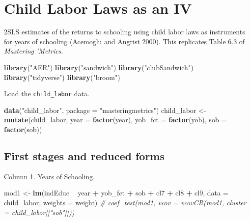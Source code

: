 \documentclass[]{book}
\newenvironment{Shaded}{\begin{snugshade}}{\end{snugshade}}
\newcommand{\CommentTok}[1]{\textcolor[rgb]{0.56,0.35,0.01}{\textit{#1}}}
\newcommand{\DataTypeTok}[1]{\textcolor[rgb]{0.13,0.29,0.53}{#1}}
\newcommand{\KeywordTok}[1]{\textcolor[rgb]{0.13,0.29,0.53}{\textbf{#1}}}
\newcommand{\NormalTok}[1]{#1}
\newcommand{\OperatorTok}[1]{\textcolor[rgb]{0.81,0.36,0.00}{\textbf{#1}}}
\newcommand{\StringTok}[1]{\textcolor[rgb]{0.31,0.60,0.02}{#1}}
\theoremstyle{definition}
\theoremstyle{definition}
\theoremstyle{definition}
\theoremstyle{remark}
\begin{document}
\hypertarget{child-labor-laws-as-an-iv}{%
\chapter{Child Labor Laws as an IV}\label{child-labor-laws-as-an-iv}}

2SLS estimates of the returns to schooling using child labor laws as
instruments for years of schooling (Acemoglu and Angrist 2000). This
replicates Table 6.3 of \emph{Mastering 'Metrics}.

\begin{Shaded}
\begin{Highlighting}[]
\KeywordTok{library}\NormalTok{(}\StringTok{"AER"}\NormalTok{)}
\KeywordTok{library}\NormalTok{(}\StringTok{"sandwich"}\NormalTok{)}
\KeywordTok{library}\NormalTok{(}\StringTok{"clubSandwich"}\NormalTok{)}
\KeywordTok{library}\NormalTok{(}\StringTok{"tidyverse"}\NormalTok{)}
\KeywordTok{library}\NormalTok{(}\StringTok{"broom"}\NormalTok{)}
\end{Highlighting}
\end{Shaded}

Load the \texttt{child\_labor} data.

\begin{Shaded}
\begin{Highlighting}[]
\KeywordTok{data}\NormalTok{(}\StringTok{"child_labor"}\NormalTok{, }\DataTypeTok{package =} \StringTok{"masteringmetrics"}\NormalTok{)}
\NormalTok{child_labor <-}\StringTok{ }\KeywordTok{mutate}\NormalTok{(child_labor,}
                      \DataTypeTok{year =} \KeywordTok{factor}\NormalTok{(year),}
                      \DataTypeTok{yob_fct =} \KeywordTok{factor}\NormalTok{(yob),}
                      \DataTypeTok{sob =} \KeywordTok{factor}\NormalTok{(sob))}
\end{Highlighting}
\end{Shaded}

\hypertarget{first-stages-and-reduced-forms}{%
\section{First stages and reduced
forms}\label{first-stages-and-reduced-forms}}

Column 1. Years of Schooling.

\begin{Shaded}
\begin{Highlighting}[]
\NormalTok{mod1 <-}\StringTok{ }\KeywordTok{lm}\NormalTok{(indEduc }\OperatorTok{~}\StringTok{ }\NormalTok{year }\OperatorTok{+}\StringTok{ }\NormalTok{yob_fct }\OperatorTok{+}\StringTok{ }\NormalTok{sob }\OperatorTok{+}\StringTok{ }\NormalTok{cl7 }\OperatorTok{+}\StringTok{ }\NormalTok{cl8 }\OperatorTok{+}\StringTok{ }\NormalTok{cl9,}
           \DataTypeTok{data =}\NormalTok{ child_labor, }\DataTypeTok{weights =}\NormalTok{ weight)}
\CommentTok{# coef_test(mod1, vcov = vcovCR(mod1, cluster = child_labor[["sob"]]))}
\end{Highlighting}
\end{Shaded}
\end{document}
